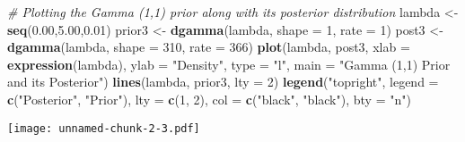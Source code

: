 \documentclass[]{article}
\newenvironment{Shaded}{\begin{snugshade}}{\end{snugshade}}
\newcommand{\AttributeTok}[1]{\textcolor[rgb]{0.13,0.29,0.53}{#1}}
\newcommand{\CommentTok}[1]{\textcolor[rgb]{0.56,0.35,0.01}{\textit{#1}}}
\newcommand{\DecValTok}[1]{\textcolor[rgb]{0.00,0.00,0.81}{#1}}
\newcommand{\FloatTok}[1]{\textcolor[rgb]{0.00,0.00,0.81}{#1}}
\newcommand{\FunctionTok}[1]{\textcolor[rgb]{0.13,0.29,0.53}{\textbf{#1}}}
\newcommand{\NormalTok}[1]{#1}
\newcommand{\OtherTok}[1]{\textcolor[rgb]{0.56,0.35,0.01}{#1}}
\newcommand{\StringTok}[1]{\textcolor[rgb]{0.31,0.60,0.02}{#1}}
\begin{document}
\begin{enumerate}
\begin{Shaded}
\begin{Highlighting}[]
\CommentTok{\# Plotting the Gamma (1,1) prior along with its posterior distribution}
\NormalTok{lambda }\OtherTok{\textless{}{-}} \FunctionTok{seq}\NormalTok{(}\FloatTok{0.00}\NormalTok{,}\FloatTok{5.00}\NormalTok{,}\FloatTok{0.01}\NormalTok{)}
\NormalTok{prior3 }\OtherTok{\textless{}{-}} \FunctionTok{dgamma}\NormalTok{(lambda, }\AttributeTok{shape =} \DecValTok{1}\NormalTok{, }\AttributeTok{rate =} \DecValTok{1}\NormalTok{)}
\NormalTok{post3 }\OtherTok{\textless{}{-}} \FunctionTok{dgamma}\NormalTok{(lambda, }\AttributeTok{shape =} \DecValTok{310}\NormalTok{, }\AttributeTok{rate =} \DecValTok{366}\NormalTok{)}
\FunctionTok{plot}\NormalTok{(lambda, post3, }\AttributeTok{xlab =} \FunctionTok{expression}\NormalTok{(lambda), }\AttributeTok{ylab =} \StringTok{"Density"}\NormalTok{, }
     \AttributeTok{type =} \StringTok{"l"}\NormalTok{, }\AttributeTok{main =} \StringTok{"Gamma (1,1) Prior and its Posterior"}\NormalTok{)}
\FunctionTok{lines}\NormalTok{(lambda, prior3, }\AttributeTok{lty =} \DecValTok{2}\NormalTok{)}
\FunctionTok{legend}\NormalTok{(}\StringTok{"topright"}\NormalTok{, }\AttributeTok{legend =} \FunctionTok{c}\NormalTok{(}\StringTok{"Posterior"}\NormalTok{, }\StringTok{"Prior"}\NormalTok{),  }
       \AttributeTok{lty =} \FunctionTok{c}\NormalTok{(}\DecValTok{1}\NormalTok{, }\DecValTok{2}\NormalTok{),  }
       \AttributeTok{col =} \FunctionTok{c}\NormalTok{(}\StringTok{"black"}\NormalTok{, }\StringTok{"black"}\NormalTok{),  }
       \AttributeTok{bty =} \StringTok{"n"}\NormalTok{) }
\end{Highlighting}
\end{Shaded}

\texttt{[image: unnamed-chunk-2-3.pdf]}


\end{enumerate}
\end{document}

